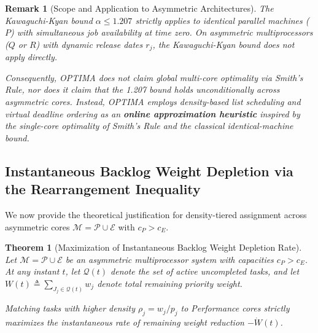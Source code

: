 \documentclass[conference]{IEEEtran}
\newtheorem{theorem}{Theorem}
\newtheorem{remark}{Remark}
\begin{document}
\begin{remark}[Scope and Application to Asymmetric Architectures]
The Kawaguchi-Kyan bound $\alpha \le 1.207$ strictly applies to \emph{identical parallel machines} ($P$) with simultaneous job availability at time zero. On asymmetric multiprocessors ($Q$ or $R$) with dynamic release dates $r_j$, the Kawaguchi-Kyan bound does not apply directly. 

Consequently, OPTIMA does \emph{not} claim global multi-core optimality via Smith's Rule, nor does it claim that the 1.207 bound holds unconditionally across asymmetric cores. Instead, OPTIMA employs density-based list scheduling and virtual deadline ordering as an \textbf{online approximation heuristic} inspired by the single-core optimality of Smith's Rule and the classical identical-machine bound.
\end{remark}

\subsection{Instantaneous Backlog Weight Depletion via the Rearrangement Inequality}
We now provide the theoretical justification for density-tiered assignment across asymmetric cores $\mathcal{M} = \mathcal{P} \cup \mathcal{E}$ with $c_P > c_E$.

\begin{theorem}[Maximization of Instantaneous Backlog Weight Depletion Rate]
\label{thm:rearrangement_depletion}
Let $\mathcal{M} = \mathcal{P} \cup \mathcal{E}$ be an asymmetric multiprocessor system with capacities $c_P > c_E$. At any instant $t$, let $\mathcal{Q}(t)$ denote the set of active uncompleted tasks, and let $W(t) \triangleq \sum_{J_j \in \mathcal{Q}(t)} w_j$ denote total remaining priority weight. 

Matching tasks with higher density $\rho_j = w_j / p_j$ to Performance cores strictly maximizes the instantaneous rate of remaining weight reduction $-\dot{W}(t)$.
\end{theorem}
\end{document}
